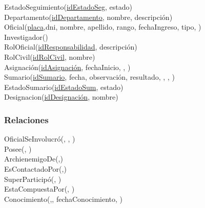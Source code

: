 EstadoSeguimiento(\uline{idEstadoSeg}, estado) \\

Departamento(\uline{idDepartamento}, nombre, descripción)\\

Oficial(\uline{placa},dni, nombre, apellido, rango, fechaIngreso, tipo,
) \\

Investigador()\\

RolOficial(\uline{idResponsabilidad}, descripción)\\

RolCivil(\uline{idRolCivil}, nombre)\\

Asignación(\uline{idAsignación}, fechaInicio, , )\\

Sumario(\uline{idSumario}, fecha, observación, resultado, ,
, )\\

EstadoSumario(\uline{idEstadoSum}, estado) \\

Designacion(\uline{idDesignación}, nombre) \\

\subsubsection{Relaciones}\label{relaciones}

OficialSeInvolucró(, , )\\

Posee(, )\\

ArchienemigoDe(,)\\

EsContactadoPor(,)\\

SuperParticipó(, )\\

EstaCompuestaPor(, )\\

Conocimiento(,,
fechaConocimiento, )\\

